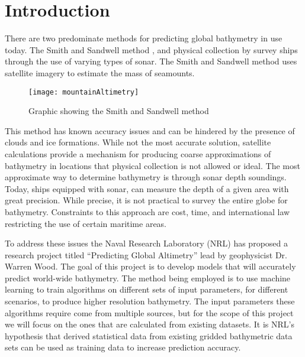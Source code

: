 \section{Introduction}
There are two predominate methods for predicting global bathymetry in use today.  
The Smith and Sandwell method \cite{sandwell}, and physical collection by survey ships through the use of varying types of sonar.  
The Smith and Sandwell method uses satellite imagery to estimate the mass of seamounts.

\begin{figure}[hb]
    \centering
    \texttt{[image: mountainAltimetry]}
    \caption{Graphic showing the Smith and Sandwell method}
    \label{fig1:Figure 2}
\end{figure}

\par
This method has known accuracy issues and can be hindered by the presence of clouds and ice formations. 
While not the most accurate solution, satellite calculations provide a mechanism for producing coarse approximations of bathymetry in locations that physical collection is not allowed or ideal. 
The most approximate way to determine bathymetry is through sonar depth soundings. 
Today, ships equipped with sonar, can measure the depth of a given area with great precision.  
While precise, it is not practical to survey the entire globe for bathymetry.  
Constraints to this approach are cost, time, and international law restricting the use of certain maritime areas.

\par
To address these issues the Naval Research Laboratory (NRL) has proposed a research project titled “Predicting Global Altimetry” lead by geophysicist Dr. Warren Wood. 
The goal of this project is to develop models that will accurately predict world-wide bathymetry.  
The method being employed is to use machine learning to train algorithms on different sets of input parameters, for different scenarios, to produce higher resolution bathymetry.  
The input parameters these algorithms require come from multiple sources, but for the scope of this project we will focus on the ones that are calculated from existing datasets.  
It is NRL’s hypothesis that derived statistical data from existing gridded bathymetric data sets can be used as training data to increase prediction accuracy.